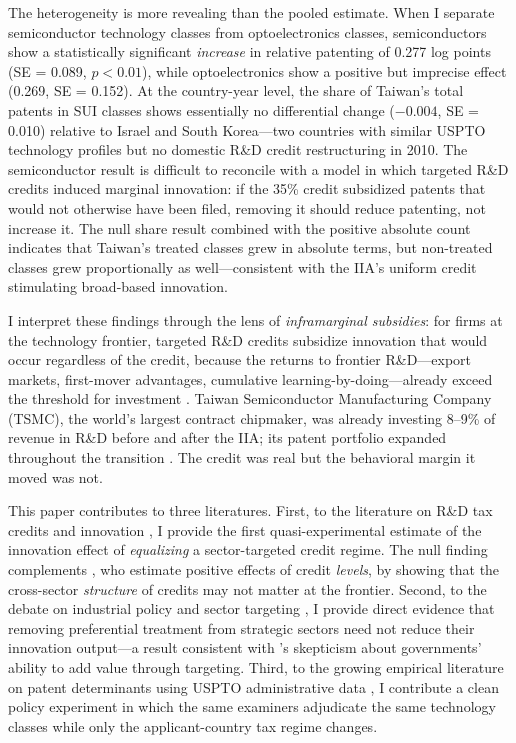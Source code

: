 \documentclass[12pt]{article}
\begin{document}
The heterogeneity is more revealing than the pooled estimate. When I separate semiconductor technology classes from optoelectronics classes, semiconductors show a statistically significant \textit{increase} in relative patenting of 0.277 log points (SE = 0.089, $p < 0.01$), while optoelectronics show a positive but imprecise effect (0.269, SE = 0.152). At the country-year level, the share of Taiwan's total patents in SUI classes shows essentially no differential change ($-0.004$, SE = 0.010) relative to Israel and South Korea---two countries with similar USPTO technology profiles but no domestic R\&D credit restructuring in 2010. The semiconductor result is difficult to reconcile with a model in which targeted R\&D credits induced marginal innovation: if the 35\% credit subsidized patents that would not otherwise have been filed, removing it should reduce patenting, not increase it. The null share result combined with the positive absolute count indicates that Taiwan's treated classes grew in absolute terms, but non-treated classes grew proportionally as well---consistent with the IIA's uniform credit stimulating broad-based innovation.

I interpret these findings through the lens of \textit{inframarginal subsidies}: for firms at the technology frontier, targeted R\&D credits subsidize innovation that would occur regardless of the credit, because the returns to frontier R\&D---export markets, first-mover advantages, cumulative learning-by-doing---already exceed the threshold for investment \citep{hall2000tax, wilson2009tax}. Taiwan Semiconductor Manufacturing Company (TSMC), the world's largest contract chipmaker, was already investing 8--9\% of revenue in R\&D before and after the IIA; its patent portfolio expanded throughout the transition \citep{tsmc2010annual}. The credit was real but the behavioral margin it moved was not.

This paper contributes to three literatures. First, to the literature on R\&D tax credits and innovation \citep{bloom2002patents, rao2016firms, chen2021evaluating}, I provide the first quasi-experimental estimate of the innovation effect of \textit{equalizing} a sector-targeted credit regime. The null finding complements \citet{dechezlepretre2016tax}, who estimate positive effects of credit \textit{levels}, by showing that the cross-sector \textit{structure} of credits may not matter at the frontier. Second, to the debate on industrial policy and sector targeting \citep{rodrik2004industrial, lane2020new, juhasz2023new}, I provide direct evidence that removing preferential treatment from strategic sectors need not reduce their innovation output---a result consistent with \citet{pack2006case}'s skepticism about governments' ability to add value through targeting. Third, to the growing empirical literature on patent determinants using USPTO administrative data \citep{frakes2017patent, sampat2019examiner}, I contribute a clean policy experiment in which the same examiners adjudicate the same technology classes while only the applicant-country tax regime changes.
\end{document}
